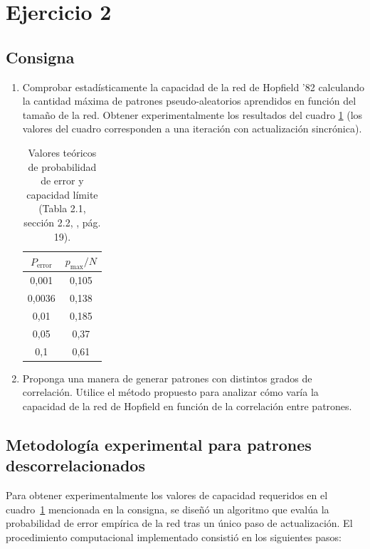 \section{Ejercicio 2}
\label{sec:ej2}

\subsection{Consigna}

\begin{enumerate}
	\item[\textbf{a)}] Comprobar estadísticamente la capacidad de la red de Hopfield '82 calculando la cantidad máxima de patrones pseudo-aleatorios aprendidos en función del tamaño de la red. Obtener experimentalmente los resultados del cuadro \ref{tab:teorica_hertz} (los valores del cuadro corresponden a una iteración con actualización sincrónica).
	
	\begin{table}[htbp]
		\centering
		\begin{tabular}{cc}
			\toprule
			\textbf{$P_{\text{error}}$} & \textbf{$p_{\text{max}}/N$} \\
			\midrule
			0,001 & 0,105 \\
			0,0036 & 0,138 \\
			0,01 & 0,185 \\
			0,05 & 0,37 \\
			0,1 & 0,61 \\
			\bottomrule
		\end{tabular}
		\caption{Valores teóricos de probabilidad de error y capacidad límite (Tabla 2.1, sección 2.2, \cite{hertz1991}, pág. 19).}
		\label{tab:teorica_hertz}
	\end{table}
	
	\item[\textbf{b)}] Proponga una manera de generar patrones con distintos grados de correlación. Utilice el método propuesto para analizar cómo varía la capacidad de la red de Hopfield en función de la correlación entre patrones.
\end{enumerate}


\subsection{Metodología experimental para patrones descorrelacionados}
\label{subsec:metodologia_ej2}

Para obtener experimentalmente los valores de capacidad requeridos en el cuadro~\ref{tab:teorica_hertz} mencionada en la consigna, se diseñó un algoritmo que evalúa la probabilidad de error empírica de la red tras un único paso de actualización. El procedimiento computacional implementado consistió en los siguientes pasos:


